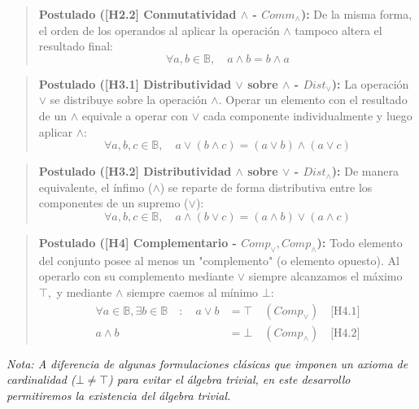 \begin{quote}\textbf{Postulado ([H2.2] Conmutatividad $\wedge$ - $Comm_\wedge$):}\label{conmut_wedge}
De la misma forma, el orden de los operandos al aplicar la operación $\wedge$ tampoco altera el resultado final:
\[ \forall a, b \in \mathbb{B}, \quad a \wedge b = b \wedge a \]
\end{quote}

\begin{quote}\textbf{Postulado ([H3.1] Distributividad $\vee$ sobre $\wedge$ - $Dist_\vee$):}\label{distrib_vee_wedge}
La operación $\vee$ se distribuye sobre la operación $\wedge.$ Operar un elemento con el resultado de un $\wedge$ equivale a operar con $\vee$ cada componente individualmente y luego aplicar $\wedge:$
\[ \forall a, b, c \in \mathbb{B}, \quad a \vee (b \wedge c) = (a \vee b) \wedge (a \vee c) \]
\end{quote}

\begin{quote}\textbf{Postulado ([H3.2] Distributividad $\wedge$ sobre $\vee$ - $Dist_\wedge$):}\label{distrib_wedge_vee}
De manera equivalente, el ínfimo ($\wedge$) se reparte de forma distributiva entre los componentes de un supremo ($\vee$):
\[ \forall a, b, c \in \mathbb{B}, \quad a \wedge (b \vee c) = (a \wedge b) \vee (a \wedge c) \]
\end{quote}

\begin{quote}\textbf{Postulado ([H4] Complementario - $Comp_\vee, Comp_\wedge$):}\label{comp}
Todo elemento del conjunto posee al menos un "complemento" (o elemento opuesto). Al operarlo con su complemento mediante $\vee$ siempre alcanzamos el máximo $\top,$ y mediante $\wedge$ siempre caemos al mínimo $\bot:$
\begin{align*}
\forall a \in \mathbb{B}, \exists b \in \mathbb{B} \quad : \quad a \vee b &= \top \quad (Comp_\vee) \quad \text{[H4.1]} \\
a \wedge b &= \bot \quad (Comp_\wedge) \quad \text{[H4.2]}
\end{align*}
\end{quote}

\textit{Nota: A diferencia de algunas formulaciones clásicas que imponen un axioma de cardinalidad ($\bot \neq \top$) para evitar el álgebra trivial, en este desarrollo permitiremos la existencia del álgebra trivial.}

